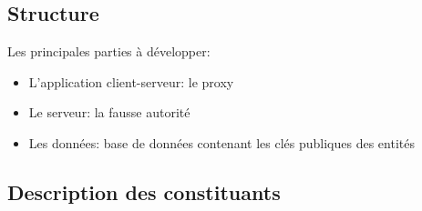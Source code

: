 \documentclass[a4paper,11pt,french]{article}
\begin{document}
\subsection{Structure}
Les principales parties à développer:
\begin{itemize}
\item L'application client-serveur: le proxy
\item Le serveur: la fausse autorité 
\item Les données: base de données contenant les clés publiques des entités
\end{itemize}


\subsection{Description des constituants}
\end{document}
